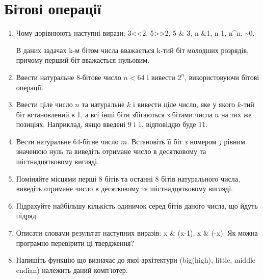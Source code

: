 \documentclass[]{article}
\begin{document}
\section{Бітові операції}

\begin{enumerate}
\item
Чому дорівнюють наступні вирази: 3\textless{}\textless{}2,
5\textgreater{}\textgreater{}2, 5 \& 3, n \&1, n \textbar{} 1, n\^{}n,
\textasciitilde{}0.

В даних задачах k-м бітом числа вважається k-тий біт молодших розрядів,
причому перший біт вважається нульовим.

\item
  Ввести натуральне 8-бітове число $n<64$ і вивести $2^{n}$, використовуючи бітові операції.
\item
  Ввести ціле число $n$ та натуральне $k$ і вивести ціле число, яке у якого
  $k$-тий біт встановлений в 1, а всі інші біти збігаються з бітами числа $n$
  на тих же позиціях. Наприклад, якщо введені 9 і 1, відповіддю буде 11.
\item
  Вести натуральне 64-бітне число $m$. Встановіть її біт
  з номером $j$ рівним значенюю нуль та виведіть отримане число в десятковому та
  шістнадцятковому вигляді.
\item
  Поміняйте місцями перші 8 бітів та останні 8 бітів натурального числа,
  виведіть отримане число в десятковому та шістнадцятковому вигляді.
\item
  Підрахуйте найбільшу кількість одиничок серед бітів даного числа, що
  йдуть підряд.
\item
  Описати словами результат наступних виразів: x \& (x-1), x \& (-x). 
Як можна програмно перевірити ці твердження?
\item
  Напишіть функцію що визначає до якої архітектури (big(high), little, middle
  endian) належить даний комп'ютер.


\end{enumerate}
\end{document}

